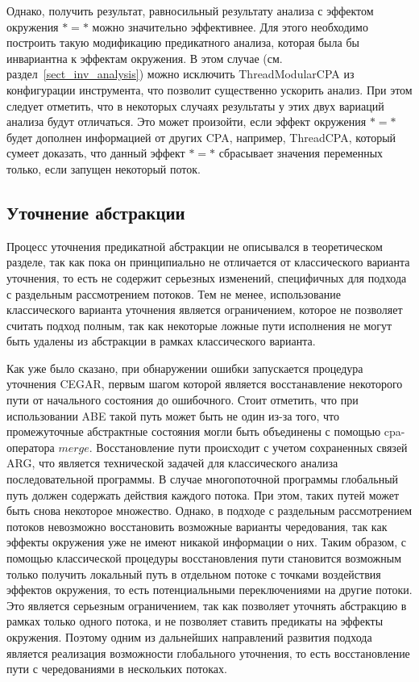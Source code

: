 Однако, получить результат, равносильный результату анализа с эффектом окружения $* = *$ можно значительно эффективнее.
Для этого необходимо построить такую модификацию предикатного анализа, которая была бы инвариантна к эффектам окружения.
В этом случае (см. раздел~\ref{sect_inv_analysis}) можно исключить ThreadModularCPA из конфигурации инструмента, что позволит существенно ускорить анализ.
При этом следует отметить, что в некоторых случаях результаты у этих двух вариаций анализа будут отличаться.
Это может произойти, если эффект окружения $* = *$ будет дополнен информацией от других CPA, например, ThreadCPA, который сумеет доказать, что данный эффект $* = *$ сбрасывает значения переменных только, если запущен некоторый поток.

\subsection{Уточнение абстракции}
\label{sect_predicate_refinement}
Процесс уточнения предикатной абстракции не описывался в теоретическом разделе, так как пока он принципиально не отличается от классического варианта уточнения, то есть не содержит серьезных изменений, специфичных для подхода с раздельным рассмотрением потоков.
Тем не менее, использование классического варианта уточнения является ограничением, которое не позволяет считать подход полным, так как некоторые ложные пути исполнения не могут быть удалены из абстракции в рамках классического варианта.

Как уже было сказано, при обнаружении ошибки запускается процедура уточнения CEGAR, первым шагом которой является восстанавление некоторого пути от начального состояния до ошибочного.  
Стоит отметить, что при использовании ABE такой путь может быть не один из-за того, что промежуточные абстрактные состояния могли быть объединены с помощью cpa-оператора $merge$. 
Восстановление пути происходит с учетом сохраненных связей ARG, что является технической задачей для классического анализа последовательной программы.
В случае многопоточной программы глобальный путь должен содержать действия каждого потока.
При этом, таких путей может быть снова некоторое множество.
Однако, в подходе с раздельным рассмотрением потоков невозможно восстановить возможные варианты чередования, так как эффекты окружения уже не имеют никакой информации о них.
Таким образом, с помощью классической процедуры восстановления пути становится возможным только получить локальный путь в отдельном потоке с точками воздействия эффектов окружения, то есть потенциальными переключениями на другие потоки. 
Это является серьезным ограничением, так как позволяет уточнять абстракцию в рамках только одного потока, и не позволяет ставить предикаты на эффекты окружения.
Поэтому одним из дальнейших направлений развития подхода является реализация возможности глобального уточнения, то есть восстановление пути с чередованиями в нескольких потоках.

